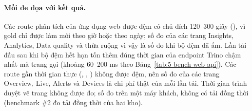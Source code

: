 \paragraph{Mối đe dọa với kết quả.} Các route phân tích của ứng dụng web được đệm có chủ đích 120--300 giây (), vì gold chỉ được làm mới theo giờ hoặc theo ngày; số đo của các trang Insights, Analytics, Data quality và thửa ruộng vì vậy là số đo khi bộ đệm đã ấm. Lần tải đầu sau khi bộ đệm hết hạn tốn thêm đúng thời gian của endpoint Trino chậm nhất mà trang gọi (khoảng 60--200 ms theo Bảng~\ref{tab:5-bench-web-api}). Các route gần thời gian thực (, , ) không được đệm, nên số đo của các trang Overview, Live, Alerts và Devices là chi phí thật của mỗi lần tải. Thời gian trình duyệt vẽ trang không được đo; số đo trên một máy khách, không có tải đồng thời (benchmark \#2 đo tải đồng thời của hai kho).

